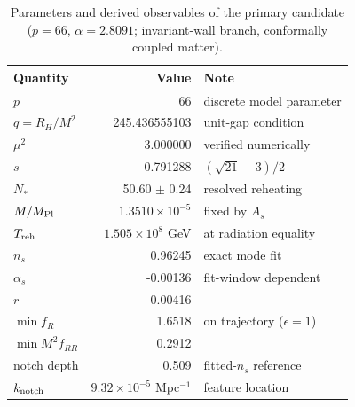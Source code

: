 \begin{table}[htbp]
\centering
\small
\setlength{\tabcolsep}{4pt}
\begin{tabular}{l r l}
\hline
Quantity & Value & Note \\
\hline
$p$ & 66 & discrete model parameter \\
$q = R_H/M^2$ & 245.436555103 & unit-gap condition \\
$\mu^2$ & 3.000000 & verified numerically \\
$s$ & 0.791288 & $(\sqrt{21}-3)/2$ \\
$N_*$ & 50.60 $\pm$ 0.24 & resolved reheating \\
$M/M_{\rm Pl}$ & $1.3510\times10^{-5}$ & fixed by $A_s$ \\
$T_{\rm reh}$ & $1.505\times10^{8}$ GeV & at radiation equality \\
$n_s$ & 0.96245 & exact mode fit \\
$\alpha_s$ & -0.00136 & fit-window dependent \\
$r$ & 0.00416 &  \\
$\min f_R$ & 1.6518 & on trajectory ($\epsilon=1$) \\
$\min M^2 f_{RR}$ & 0.2912 &  \\
notch depth & 0.509 & fitted-$n_s$ reference \\
$k_{\rm notch}$ & $9.32\times10^{-5}$ Mpc$^{-1}$ & feature location \\
\hline
\end{tabular}
\caption{Parameters and derived observables of the primary candidate ($p=66$, $\alpha=2.8091$; invariant-wall branch, conformally coupled matter).}
\label{tab:candidate}
\end{table}
